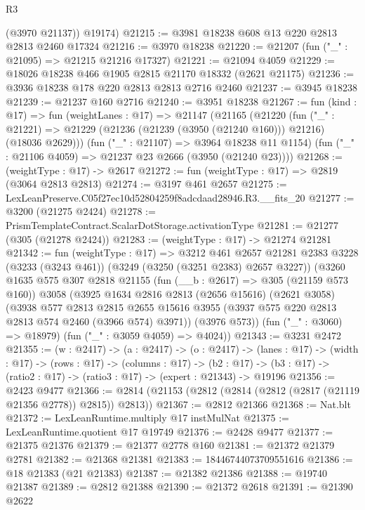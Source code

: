 \begin{lexlean}{R3}
\begin{coremodule}
        (@3970 @21137))
      @19174)
@21215 := @3981 @18238 @608 @13 @220 @2813 @2813 @2460 @17324
@21216 := @3970 @18238
@21220 := @21207 (fun ("_" : @21095) => @21215 @21216 @17327)
@21221 := @21094 @4059
@21229 := @18026 @18238 @466 @1905 @2815 @21170 @18332 (@2621 @21175)
@21236 := @3936 @18238 @178 @220 @2813 @2813 @2716 @2460
@21237 := @3945 @18238
@21239 := @21237 @160 @2716
@21240 := @3951 @18238
@21267 := fun (kind : @17) =>
  fun (weightLanes : @17) =>
  @21147
    (@21165
      (@21220
        (fun ("_" : @21221) =>
        @21229 (@21236 (@21239 (@3950 (@21240 @160))) @21216) (@18036 @2629)))
      (fun ("_" : @21107) => @3964 @18238 @11 @1154)
      (fun ("_" : @21106 @4059) => @21237 @23 @2666 (@3950 (@21240 @23))))
@21268 := (weightType : @17) -> @2617
@21272 := fun (weightType : @17) => @2819 (@3064 @2813 @2813)
@21274 := @3197 @461 @2657
@21275 := LexLeanPreserve.C05f27ec10d52804259f8adcdaad28946.R3.__fits_20
@21277 := @3200 (@21275 @2424)
@21278 := PrismTemplateContract.ScalarDotStorage.activationType
@21281 := @21277 (@305 (@21278 @2424))
@21283 := (weightType : @17) -> @21274 @21281
@21342 := fun (weightType : @17) =>
  @3212
    @461
    @2657
    @21281
    @2383
    @3228
    (@3233 (@3243 @461))
    (@3249 (@3250 (@3251 @2383) @2657 @3227))
    (@3260
      @1635
      @575
      @307
      @2818
      @21155
      (fun (__b : @2617) => @305 (@21159 @573 @160))
      @3058
      (@3925
        @1634
        @2816
        @2813
        (@2656 @15616)
        (@2621 @3058)
        (@3938
          @577
          @2813
          @2815
          @2655
          @15616
          @3955
          (@3937 @575 @220 @2813 @2813 @574 @2460 (@3966 @574) @3971))
        (@3976 @573))
      (fun ("_" : @3060) => @18979)
      (fun ("_" : @3059 @4059) => @4024))
@21343 := @3231 @2472
@21355 := (w : @2417) ->
  (a : @2417) ->
  (o : @2417) ->
  (lanes : @17) ->
  (width : @17) ->
  (rows : @17) ->
  (columns : @17) ->
  (b2 : @17) -> (b3 : @17) -> (ratio2 : @17) -> (ratio3 : @17) -> (expert : @21343) -> @19196
@21356 := @2423 @9477
@21366 := @2814 (@21153 (@2812 (@2814 (@2812 (@2817 (@21119 @21356 @2778)) @2815)) @2813))
@21367 := @2812 @21366
@21368 := Nat.blt
@21372 := LexLeanRuntime.multiply @17 instMulNat
@21375 := LexLeanRuntime.quotient @17 @19749
@21376 := @2428 @9477
@21377 := @21375 @21376
@21379 := @21377 @2778 @160
@21381 := @21372 @21379 @2781
@21382 := @21368 @21381
@21383 := 18446744073709551616
@21386 := @18 @21383 (@21 @21383)
@21387 := @21382 @21386
@21388 := @19740 @21387
@21389 := @2812 @21388
@21390 := @21372 @2618
@21391 := @21390 @2622

\end{coremodule}
\end{lexlean}
